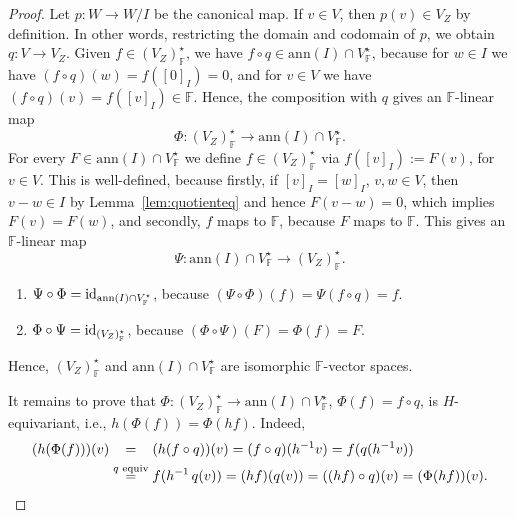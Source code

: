 \documentclass[a4paper]{extarticle}
\newcommand{\IF}{\mathbb{F}}
\newcommand{\ann}{\mathrm{ann}}
\newcommand{\coinv}{V_Z}
\numberwithin{theorem}{section}
\theoremstyle{definition}
\begin{document}
\begin{proof}
Let $p:W\to W/I$ be the canonical map. If $v\in V$, then $p(v) \in \coinv$ by definition. In other words, restricting the domain and codomain of $p$, we obtain $q:V\to \coinv$.
Given $f\in (\coinv)^\star_\IF$, we have $f\circ q \in \ann(I)\cap V^\star_\IF$,
because for $w\in I$ we have $(f\circ q)(w) = f([0]_I)=0$, and for $v\in V$ we have $(f\circ q)(v)=f([v]_I)\in\IF$.
Hence, the composition with $q$ gives an $\IF$-linear map
\[
\Phi:(\coinv)^\star_\IF\to\ann(I)\cap V^\star_\IF.
\]
For every $F\in \ann(I)\cap V^\star_\IF$ we define $f\in(\coinv)^\star_\IF$ via $f([v]_I) := F(v)$, for $v\in V$.
This is well-defined, because firstly, if $[v]_I=[w]_I$, $v,w\in V$, then $v-w\in I$ by Lemma~\ref{lem:quotienteq} and hence
$F(v-w)=0$, which implies $F(v) = F(w)$,
and secondly, $f$ maps to $\IF$, because $F$ maps to $\IF$.
This gives an $\IF$-linear map
\[
\Psi:\ann(I)\cap V^\star_\IF\to(\coinv)^\star_\IF.
\]
\begin{enumerate}
\item $\Psi\circ\Phi = \textup{id}_{\ann(I)\cap V^\star_\IF}$, because $(\Psi\circ\Phi)(f) = \Psi(f\circ q) = f$.
\item $\Phi\circ\Psi = \textup{id}_{(\coinv)^\star_\IF}$, because $(\Phi\circ\Psi)(F) = \Phi(f) = F$.
\end{enumerate}
Hence, $(\coinv)^\star_\IF$ and $\ann(I)\cap V^\star_\IF$ are isomorphic $\IF$-vector spaces.
 
It remains to prove that $\Phi:(\coinv)^\star_\IF\to\ann(I)\cap V^\star_\IF$, $\Phi(f)=f\circ q$,
is $H$-equivariant, i.e., $h(\Phi(f)) = \Phi(hf)$.
Indeed,
\begin{align*}
(h(\Phi(f)))(v)&\overset{\hphantom{q \textup{ equiv}}}{=} (h(f\circ q))(v)
=(f\circ q)(h^{-1}v)
=f(q(h^{-1}v))
\\
&\overset{q \textup{ equiv}}{=}
f(h^{-1} \, q(v))
=(hf)(q(v))
= ((hf)\circ q)(v) = (\Phi(hf))(v).\qedhere
\end{align*}
\end{proof}
\end{document}
